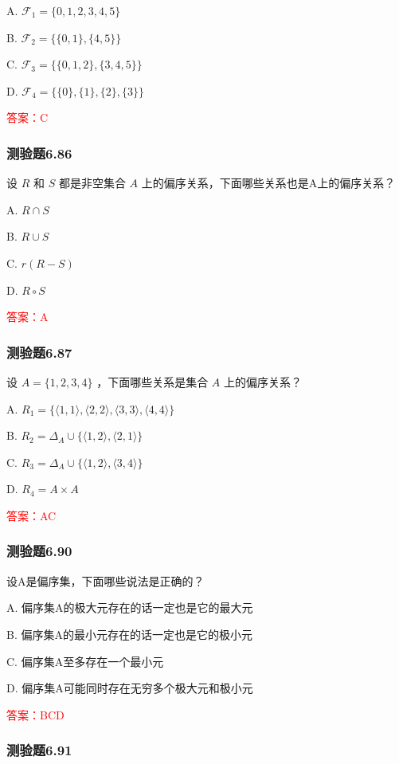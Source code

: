 \documentclass[UTF8, heading=true]{ctexart}
\begin{document}
A. $\mathcal{F}_1=\{0,1,2,3,4,5\}$

B. $\mathcal{F}_2=\{\{0,1\},\{4,5\}\}$

C. $\mathcal{F}_3=\{\{0,1,2\},\{3,4,5\}\}$

D. $\mathcal{F}_4=\{\{0\},\{1\},\{2\},\{3\}\}$

\textcolor{red}{答案：C}

\subsubsection{测验题6.86}

设 $R$ 和 $S$ 都是非空集合 $A$ 上的偏序关系，下面哪些关系也是A上的偏序关系？

A. $R \cap S$

B. $R \cup S$

C. $r(R-S)$

D. $R \circ S$

\textcolor{red}{答案：A}


\subsubsection{测验题6.87}

设 $A=\{1,2,3,4\}$ ，下面哪些关系是集合 $A$ 上的偏序关系？


A. $
R_1=\{\langle 1,1\rangle,\langle 2,2\rangle,\langle 3,3\rangle,\langle 4,4\rangle\}
$

B. $R_2=\Delta_A \cup\{\langle 1,2\rangle,\langle 2,1\rangle\}$

C. $R_3=\Delta_A \cup\{\langle 1,2\rangle,\langle 3,4\rangle\}$

D. $R_4=A \times A$

\textcolor{red}{答案：AC}

\subsubsection{测验题6.90}

设A是偏序集，下面哪些说法是正确的？

A. 偏序集A的极大元存在的话一定也是它的最大元

B. 偏序集A的最小元存在的话一定也是它的极小元

C. 偏序集A至多存在一个最小元

D. 偏序集A可能同时存在无穷多个极大元和极小元

\textcolor{red}{答案：BCD}

\subsubsection{测验题6.91}
\end{document}
